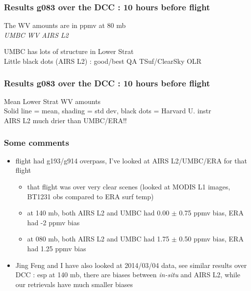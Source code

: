 \documentclass[10pt,t]{beamer}
\begin{document}
\begin{frame}
\frametitle{Results g083 over the DCC : 10 hours before flight}
The WV amounts are in ppmv at 80 mb\\
\hspace{0.5in} \emph{UMBC WV}  \hspace{2.0in} \emph{AIRS L2} \\
\begin{center}
\end{center}
UMBC has lots of structure in Lower Strat \\
Little black dots (AIRS L2) : good/best QA TSuf/ClearSky OLR
\end{frame}

\begin{frame}
\frametitle{Results g083 over the DCC : 10 hours before flight}
Mean Lower Strat WV amounts \\
Solid line = mean, shading = std dev, black dots = Harvard U. instr\\
AIRS L2 much drier than UMBC/ERA!!
\end{frame}

\begin{frame}
\frametitle{Some comments}
\begin{itemize}
  \item flight had g193/g914 overpass, I've looked at AIRS L2/UMBC/ERA for that flight
    \begin{itemize}
      \item that flight was over very clear scenes (looked at MODIS L1 images, BT1231 obs compared to ERA surf temp)
      \item at 140 mb, both AIRS L2 and UMBC had 0.00 $\pm$ 0.75 ppmv bias, ERA had -2 ppmv bias
      \item at 080 mb, both AIRS L2 and UMBC had 1.75 $\pm$ 0.50 ppmv bias, ERA had 1.25 ppmv bias      
    \end{itemize}
  \item Jing Feng and I have also looked at 2014/03/04 data, see similar results over DCC : esp at 140 mb, there
        are biases between \emph{in-situ} and AIRS L2, while our retrievals have much smaller biases
\end{itemize}
\end{frame}
\end{document}
